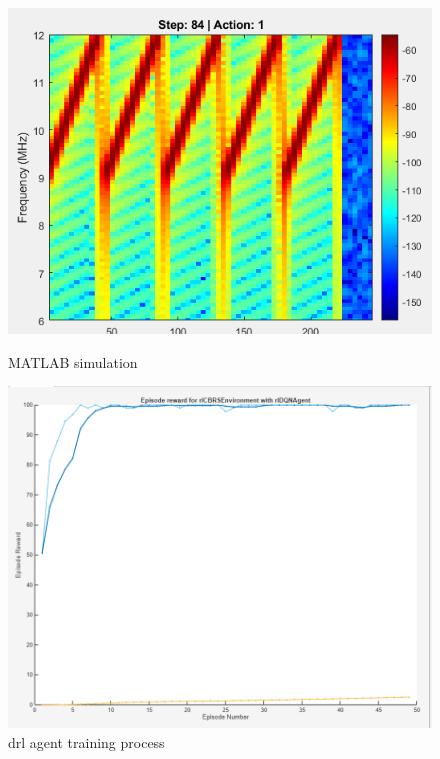 \begin{figure}[ht]
\begin{minipage}{.5\textwidth}
    \centering
    \includegraphics[width=.9\linewidth]{figures/matlab_simulation.png}
    \caption{MATLAB simulation}
\end{minipage}%
\begin{minipage}{.5\textwidth}
    \centering
    \includegraphics[width=.9\linewidth]{figures/drl-training.png}
    \caption{\gls{drl} agent training process}
\end{minipage}
\end{figure}

    